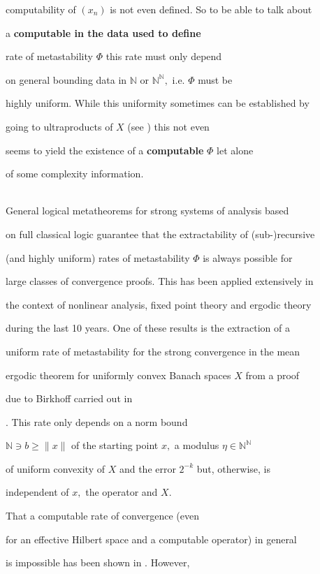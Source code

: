 \documentclass[1p]{elsarticle}
\newcommand{\NN}{\ensuremath{\mathbb{N}}}
\theoremstyle{plain}
\theoremstyle{definition}
\theoremstyle{remark}
\theoremstyle{definition}
\begin{document}
computability of $(x_n)$ is not even defined. So to be able to talk about 

a {\bf computable in the data used to define} {} 

rate of metastability $\Phi$ this rate must only depend 

on general bounding data in $\NN$ or $\NN^{\NN},$ i.e. $\Phi$ must be 

highly uniform. While this uniformity sometimes can be established by 

going to ultraproducts of $X$ (see \cite{Avigad/Iovino}) this not even 

seems to yield the existence of a {\bf computable} $\Phi$ let alone  

of some complexity information.

\\[2mm] General logical metatheorems for strong systems of analysis based 

on full classical logic guarantee that the extractability of (sub-)recursive 

(and highly uniform) rates of metastability $\Phi$ is always possible for 

large classes of convergence proofs. This has been applied extensively in 

the context of nonlinear analysis, fixed point theory and ergodic theory 

during the last 10 years. One of these results is the extraction of a 

uniform rate of metastability for the strong convergence in the mean 

ergodic theorem for uniformly convex Banach spaces $X$ from a proof 

due to Birkhoff \cite{Bir39} carried out in 

\cite{Kohlenbach/Leustean4}. This rate only depends on a norm bound 

$\NN\ni b\ge \| x\|$ of the starting point $x,$ a modulus $\eta\in\NN^{\NN}$ 

of uniform convexity of $X$ and the error $2^{-k}$ but, otherwise, is 

independent of $x,$ the operator and $X.$  

That a computable rate of convergence (even 

for an effective Hilbert space and a computable operator) in general 

is impossible has been shown in \cite{Avigad/Gerhardy/Towsner}. However, 
\end{document}
